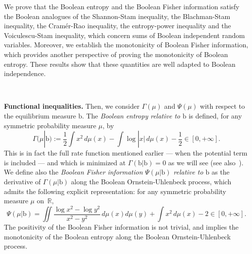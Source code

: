 \documentclass[10pt, reqno]{amsart}
\numberwithin{equation}{section}
\theoremstyle{definition}
\theoremstyle{plain}
\theoremstyle{remark}
\newcommand{\1}{\mathbbm{1}}
\begin{document}
We prove that the Boolean entropy and the Boolean Fisher information satisfy the Boolean analogues of the Shannon-Stam inequality, the Blachman-Stam inequality, the Cramér-Rao inequality, the entropy-power inequality and the Voiculescu-Stam inequality, which concern sums of Boolean independent random variables. Moreover, we establish the monotonicity of Boolean Fisher information, which provides another perspective of proving the monotonicity of Boolean entropy. These results show that these quantities are well adapted to Boolean independence.

$ $

\noindent \textbf{Functional inequalities.} Then, we consider $\Gamma(\mu)$ and $\Psi(\mu)$ with respect to the equilibrium measure $\mathbb{\mathrm{b}}$. The \emph{Boolean entropy relative to $\mathbb{\mathrm{b}}$} is defined, for any symmetric probability measure $\mu$, by
$$\Gamma(\mu|\mathbb{\mathrm{b}}):=\frac{1}{2}\int x^2\,d\mu(x) -\int \log |x|\,d\mu(x)-\frac{1}{2}\in [0,+\infty].$$
This is in fact the full rate function mentioned earlier — when the potential term is included — and which is minimized at $\Gamma(\mathbb{\mathrm{b}}|\mathbb{\mathrm{b}})=0$ as we will see (see also~\cite{pan2025entropy}). We define also the \emph{Boolean Fisher information $\Psi(\mu|\mathbb{\mathrm{b}})$ relative to $\mathbb{\mathrm{b}}$}  as the derivative of $\Gamma(\mu|\mathbb{\mathrm{b}})$ along the Boolean Ornstein-Uhlenbeck process, which admits the following explicit representation: for any symmetric probability measure $\mu$ on~$\mathbb{R}$,
$$\Psi(\mu|\mathbb{\mathrm{b}})=\iint \frac{\log x^2-\log y^2}{x^2-y^2}\,d\mu(x)d\mu(y) + \int x^2\,d\mu(x)-2\in [0,+\infty].$$
The positivity of the Boolean Fisher information is not trivial, and implies the monotonicity of the Boolean entropy along the Boolean Ornstein-Uhlenbeck process.
\end{document}
